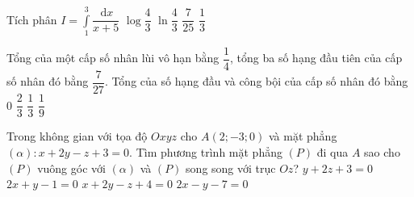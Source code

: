\begin{ex}%
	Tích phân $ I=\displaystyle\int\limits_1^3 \dfrac{\mathrm{\,d}x}{x+5} $
	\choice
	{$ \log \dfrac{4}{3} $}
	{\True $  \ln \dfrac{4}{3}$}
	{$ \dfrac{7}{25}$}
	{$ \dfrac{1}{3}$}
\end{ex}
\begin{ex}%
	Tổng của một cấp số nhân lùi vô hạn bằng $ \dfrac{1}{4} $, tổng ba số hạng đầu tiên của cấp số nhân đó bằng $ \dfrac{7}{27} $. Tổng của số hạng đầu và công bội của cấp số nhân đó bằng	
	\choice
	{\True $ 0 $}
	{$\dfrac{2}{3}  $}
	{$ \dfrac{1}{3}$}
	{$ \dfrac{1}{9}$}
\end{ex}
\begin{ex}%
	Trong không gian với tọa độ $ Oxyz $ cho $ A(2;-3;0) $ và mặt phẳng $ (\alpha) \colon x+2y-z+3=0 $. Tìm phương trình mặt phẳng $ (P) $ đi qua $ A $ sao cho $ (P) $ vuông góc với $ (\alpha) $ và $ (P) $ song song với trục $ Oz $?	
	\choice
	{$  y+2z+3=0$}
	{$  2x+y-1=0$}
	{$ x+2y-z+4=0$}
	{\True  $ 2x-y-7=0$}
\end{ex}
